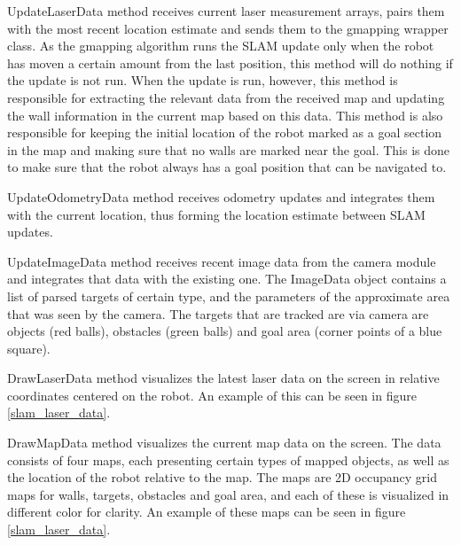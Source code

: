\documentclass[a4paper,10pt]{article}
\begin{document}

UpdateLaserData method receives current laser measurement arrays, pairs them with the most recent location estimate and sends them to the gmapping wrapper class. As the gmapping algorithm runs the SLAM update only when the robot has moven a certain amount from the last position, this method will do nothing if the update is not run. When the update is run, however, this method is responsible for extracting the relevant data from the received map and updating the wall information in the current map based on this data. This method is also responsible for keeping the initial location of the robot marked as a goal section in the map and making sure that no walls are marked near the goal. This is done to make sure that the robot always has a goal position that can be navigated to.

UpdateOdometryData method receives odometry updates and integrates them with the current location, thus forming the location estimate between SLAM updates.

UpdateImageData method receives recent image data from the camera module and integrates that data with the existing one. The ImageData object contains a list of parsed targets of certain type, and the parameters of the approximate area that was seen by the camera. The targets that are tracked are via camera are objects (red balls), obstacles (green balls) and goal area (corner points of a blue square).

DrawLaserData method visualizes the latest laser data on the screen in relative coordinates centered on the robot. An example of this can be seen in figure \ref{slam_laser_data}.

DrawMapData method visualizes the current map data on the screen. The data consists of four maps, each presenting certain types of mapped objects, as well as the location of the robot relative to the map. The maps are 2D occupancy grid maps for walls, targets, obstacles and goal area, and each of these is visualized in different color for clarity. An example of these maps can be seen in figure \ref{slam_laser_data}.
\end{document}
